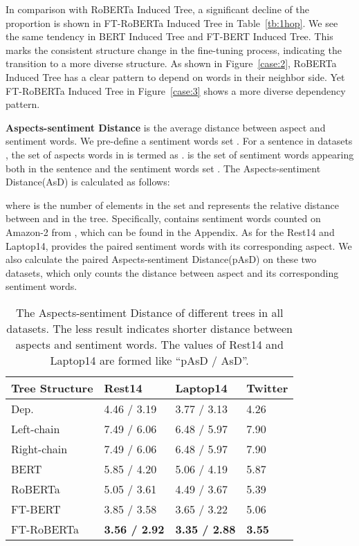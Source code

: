 \documentclass[11pt]{article}
\begin{document}
In comparison with RoBERTa Induced Tree, a significant decline of the proportion is shown in FT-RoBERTa Induced Tree  in Table~\ref{tb:1hop}. We see the same tendency in BERT Induced Tree and FT-BERT Induced Tree.  This marks the consistent structure change in the fine-tuning process, indicating the transition to a more diverse structure. As shown in Figure~\ref{case:2}, RoBERTa Induced Tree  has a clear pattern to depend on words in their neighbor side. Yet FT-RoBERTa Induced Tree in Figure~\ref{case:3} shows a more diverse dependency pattern.



\textbf{Aspects-sentiment Distance} is the average distance between aspect and sentiment words. We pre-define a sentiment words set . For a sentence  in datasets ,  the set of aspects words in  is termed as .  is the set of sentiment words appearing both in the sentence  and the sentiment words set . The Aspects-sentiment Distance(AsD) is calculated as follows:

where  is the number of elements in the set and  represents the relative distance between  and  in the tree. Specifically,   contains sentiment words counted on Amazon-2 from \citet{DBLP:conf/acl/TianGXLHWWW20}, which can be found in the Appendix. As for the Rest14 and Laptop14, \citet{dblp:conf/emnlp/xullb20} provides the paired sentiment words with its corresponding aspect. We also calculate the paired Aspects-sentiment Distance(pAsD) on these two datasets, which only counts the distance between aspect and its corresponding sentiment words.
\begin{table}[h]
  \centering\small
  \setlength\tabcolsep{1pt}
  \begin{tabular}{m{2.2cm}m{1.65cm}<{\centering}m{2cm}<{\centering}m{1.3cm}<{\centering}}
    \toprule
    Tree Structure & Rest14                 & Laptop14               & Twitter       \\
    \midrule
    Dep.           & 4.46 / 3.19            & 3.77 / 3.13            & 4.26          \\
    Left-chain     & 7.49 / 6.06            & 6.48 / 5.97            & 7.90          \\
    Right-chain    & 7.49 / 6.06            & 6.48 / 5.97            & 7.90          \\
    BERT           & 5.85 / 4.20            & 5.06 / 4.19            & 5.87          \\
    RoBERTa        & 5.05 / 3.61            & 4.49 / 3.67            & 5.39          \\
    FT-BERT        & 3.85 / 3.58            & 3.65 / 3.22            & 5.06          \\
    FT-RoBERTa     & \textbf{3.56 / 2.92  } & \textbf{3.35 / 2.88  } & \textbf{3.55} \\
    \bottomrule
  \end{tabular}
  \caption{The Aspects-sentiment Distance of different trees in all datasets. The less result indicates shorter distance between aspects and sentiment words. The values of Rest14 and Laptop14 are formed like ``pAsD / AsD''. }
  \label{tb:dis}
\end{table}
\end{document}
